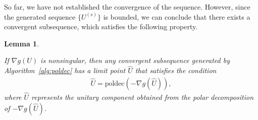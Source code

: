 \documentclass[sn-mathphys-num]{sn-jnl}%
\newtheorem{lemma}{Lemma}[section]
\theoremstyle{thmstyleone}%
\theoremstyle{thmstyletwo}%
\theoremstyle{thmstylethree}%
\begin{document}
So far, we have not established the convergence of the sequence. However, since the generated sequence $\{U^{(s)}\}$ is bounded, we can conclude that there exists a convergent subsequence, which satisfies the following property.


\begin{lemma}\label{lemma:subseq}
        
    {\color{black}If $\nabla g(U)$ is nonsingular, then any convergent subsequence generated by Algorithm~\ref{alg:poldec} has a limit point $\hat{U}$} that satisfies the condition
    \begin{eqnarray*}
        \hat{U} = \mbox{poldec}\left(-\nabla g(\hat{U})\right),
    \end{eqnarray*}
    where $\hat{U}$ 
     represents the unitary component obtained from the polar decomposition of $-\nabla g(\hat{U})$. 
\end{lemma}

\end{document}
